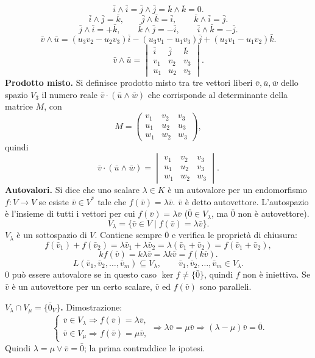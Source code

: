 \documentclass[11pt,a4paper]{article}
\newcommand{\pagina}[1]{\clearpage}
\begin{document}
\pagina{50}
\[\bar i\wedge\bar i=\bar j\wedge\bar j=\bar k\wedge\bar k=0.\]
\[\bar i\wedge\bar j=\bar k,\qquad\bar j\wedge\bar k=\bar i,\qquad\bar k\wedge\bar i=\bar j.\]
\[\bar j\wedge\bar i=+\bar k,\qquad\bar k\wedge\bar j=-\bar i,\qquad\bar i\wedge\bar k=-\bar j.\]
\[\bar v\wedge\bar u=(u_3v_2-u_2v_3)\bar i-(u_3v_1-u_1v_3)\bar j+(u_2v_1-u_1v_2)\bar k.\]
\[\bar v\wedge\bar u=\begin{vmatrix}\bar i&\bar j&\bar k\\v_1&v_2&v_3\\u_1&u_2&v_3\end{vmatrix}.\]
\textbf{Prodotto misto.} Si definisce prodotto misto tra tre vettori liberi $\bar v,\bar u,\bar w$ dello spazio $V_3$ il numero reale $\bar v\cdot(\bar u\wedge\bar w)$ che corrisponde al determinante della matrice $M$, con
\[M=\begin{pmatrix}v_1&v_2&v_3\\u_1&u_2&u_3\\w_1&w_2&w_3\end{pmatrix},\]
quindi
\[\bar v\cdot(\bar u\wedge\bar w)=\begin{vmatrix}v_1&v_2&v_3\\u_1&u_2&v_3\\w_1&w_2&w_3\end{vmatrix}.\]
\textbf{Autovalori.} Si dice che uno scalare $\lambda\in K$ è un autovalore per un endomorfismo $f:V\to V$ se esiste $\bar v\in V^*$ tale che $f(\bar v)=\lambda\bar v$. $\bar v$ è detto autovettore.
L'autospazio è l'insieme di tutti i vettori per cui $f(\bar v)=\lambda\bar v$ ($\bar0\in V_\lambda$, ma $\bar0$ non è autovettore).
\[V_\lambda=\{\bar v\in V\mid f(\bar v)=\lambda\bar v\}.\]
\pagina{51}
$V_\lambda$ è un sottospazio di $V$. Contiene sempre $\bar0$ e verifica le proprietà di chiusura:
\[f(\bar v_1)+f(\bar v_2)=\lambda\bar v_1+\lambda\bar v_2=\lambda(\bar v_1+\bar v_2)=f(\bar v_1+\bar v_2),\]
\[kf(\bar v)=k\lambda\bar v=\lambda k\bar v=f(k\bar v).\]
\[L(\bar v_1,\bar v_2,\ldots,\bar v_m)\subseteq V_\lambda,\qquad\bar v_1,\bar v_2,\ldots,\bar v_m\in V_\lambda.\]
0 può essere autovalore se in questo caso $\ker f\ne\{\bar0\}$, quindi $f$ non è iniettiva.
Se $\bar v$ è un autovettore per un certo scalare, $\bar v$ ed $f(\bar v)$ sono paralleli.

\textbf{$V_\lambda\cap V_\mu=\{\bar0_V\}$.}
Dimostrazione:
\[\begin{cases}\bar v\in V_\lambda\Longrightarrow f(\bar v)=\lambda\bar v,\\\bar v\in V_\mu\Longrightarrow f(\bar v)=\mu\bar v,\end{cases}\Longrightarrow\lambda\bar v=\mu\bar v\Longrightarrow(\lambda-\mu)\bar v=\bar0.\]
Quindi $\lambda=\mu\lor\bar v=\bar0$; la prima contraddice le ipotesi.
\end{document}
